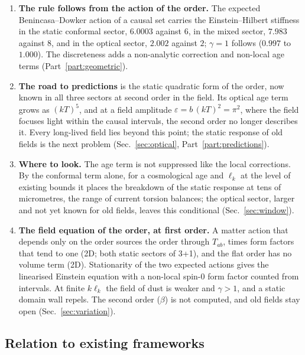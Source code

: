 \begin{enumerate}
  gravitate and tilts the cones in a static response to moving flows (Part~\ref{part:geometric}).
\item \textbf{The rule follows from the action of the order.} The expected Benincasa--Dowker action
  of a causal set carries the Einstein--Hilbert stiffness in the static conformal sector,
  $6.0003$ against $6$, in the mixed sector, $7.983$ against $8$, and in the optical sector, $2.002$
  against $2$; $\gamma=1$ follows ($0.997$ to $1.000$). The discreteness adds a non-analytic correction and
  non-local age terms (Part~\ref{part:geometric}).
\item \textbf{The road to predictions} is the static quadratic form of the order, now known in all three
  sectors at second order in the field. Its optical age term grows as $(kT)^5$, and at a field amplitude
  $\varepsilon=b\,(kT)^2=\pi^2$, where the field focuses light within the causal intervals, the second order no
  longer describes it. Every long-lived field lies beyond this point; the static response of old fields is the
  next problem (Sec.~\ref{sec:optical}, Part~\ref{part:predictions}).
\item \textbf{Where to look.} The age term is not suppressed like the local corrections. By the conformal term
  alone, for a cosmological age and $\ell_k$ at the level of existing bounds it places the breakdown of the static
  response at tens of micrometres, the range of current torsion balances; the optical sector, larger and not yet
  known for old fields, leaves this conditional (Sec.~\ref{sec:window}).
\item \textbf{The field equation of the order, at first order.} A matter action that depends only on the order
  sources the order through $T_{ab}$, times form factors that tend to one (2D; both static sectors of 3+1), and the
  flat order has no volume term (2D). Stationarity of the two expected actions gives the linearised Einstein
  equation with a non-local spin-0 form factor counted from intervals. At finite $k\ell_k$ the field of dust is
  weaker and $\gamma>1$, and a static domain wall repels. The second order ($\beta$) is not computed, and old fields
  stay open (Sec.~\ref{sec:variation}).
\end{enumerate}

\subsection{Relation to existing frameworks}

